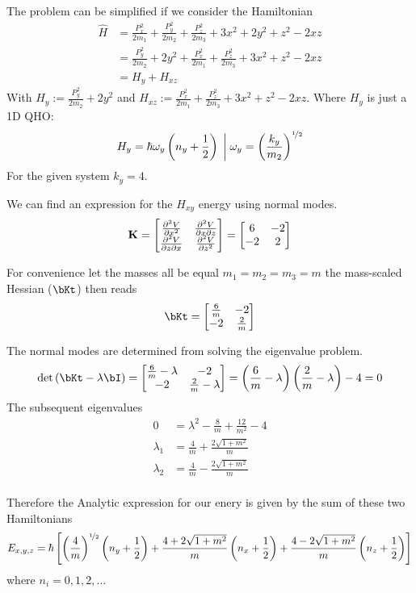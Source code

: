 \documentclass{article}
\newcommand{\be}{\begin{equation}}
\newcommand{\ee}{\end{equation}}
\newcommand{\pd}{\partial}
\newcommand{\half}{\frac{1}{2}}
\newcommand{\nhalf}{\nicefrac{1}{2}}
\newcommand{\bK}{\mbox{\bf K}}
\begin{document}
The problem can  be simplified if we consider the Hamiltonian
\be
\begin{split}
\widehat{H}&=
\frac{P_x^2}{2m_1}+\frac{P_y^2}{2m_2}+\frac{P_z^2}{2m_3}+3x^2+2y^2+z^2-2xz\\
&=\frac{P_y^2}{2m_2}+2y^2+\frac{P_x^2}{2m_1}+\frac{P_z^2}{2m_3}+3x^2+z^2-2xz\\
&= H_y + H_{xz}
\end{split}
\ee
With $H_y:=\frac{P_y^2}{2m_2}+2y^2$ and $H_{xz}:=
\frac{P_x^2}{2m_1}+\frac{P_z^2}{2m_3}+3x^2+z^2-2xz$.
Where $H_y$ is just a 1D QHO:
\be
H_y = \hbar \omega_y\left(n_y+\half\right)\;\bigg|\; \omega_y=\left(\frac{k_y}{m_2}\right)^{\nhalf}
\ee
For the given system $k_y=4$.

We can find an expression for the $H_{xy}$ energy using normal modes.
\be
\bK = \begin{bmatrix}
\frac{\pd^2 V}{\pd x^2} &\frac{\pd^2 V}{\pd x\pd z} \\
\frac{\pd^2 V}{\pd z\pd x} & \frac{\pd^2 V}{\pd z^2} \\
\end{bmatrix} = \begin{bmatrix}
6 & -2\\
-2 & 2\\
\end{bmatrix}
\ee

For convenience let the masses all be equal $m_1=m_2=m_3=m$ the mass-scaled
Hessian ($\bKt$) then reads
\be
\bKt= \begin{bmatrix}
\frac{6}{m} & -2\\
-2 & \frac{2}{m}
\end{bmatrix}
\ee

The normal modes are determined from solving the eigenvalue problem.
\be
\det\left(\bKt-\lambda\bI\right)=
\begin{bmatrix}
\frac{6}{m}-\lambda & -2\\
-2 & \frac{2}{m}-\lambda
\end{bmatrix} = \left(\frac{6}{m}-\lambda\right) \left(\frac{2}{m}-\lambda\right)-4 = 0
\ee
The subsequent eigenvalues
\be
\begin{split}
0 &=\lambda^2-\frac{8}{m}+\frac{12}{m^2}-4 \\
\lambda_1&=\frac{4}{m} + \frac{2\sqrt{1+m^2}}{m}\\
\lambda_2&=\frac{4}{m} - \frac{2\sqrt{1+m^2}}{m}\\
\end{split}
\ee

Therefore the Analytic expression for our enery is given by the sum of these
two Hamiltonians
\be
E_{x,y,z} = \hbar\left[\left(\frac{4}{m}\right)^{\nhalf} \left(n_y+\half \right) +
\frac{4+2\sqrt{1+m^2}}{m}\left(n_x+\half\right) + \frac{4-
2\sqrt{1+m^2}}{m}\left(n_z+\half\right)\right]
\ee
where $n_i=0,1,2,\dots$
\end{document}
